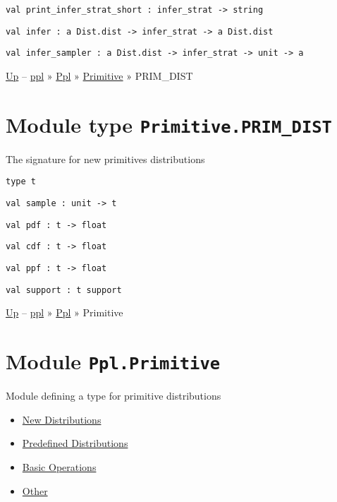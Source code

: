 \protect\hyperlink{val-printux5finferux5fstratux5fshort}{}\texttt{val\ print\_infer\_strat\_short\ :\ infer\_strat\ -\textgreater{}\ string}

\protect\hyperlink{val-infer}{}\texttt{val\ infer\ :\ \textquotesingle{}a\ Dist.dist\ -\textgreater{}\ infer\_strat\ -\textgreater{}\ \textquotesingle{}a\ Dist.dist}

\protect\hyperlink{val-inferux5fsampler}{}\texttt{val\ infer\_sampler\ :\ \textquotesingle{}a\ Dist.dist\ -\textgreater{}\ infer\_strat\ -\textgreater{}\ unit\ -\textgreater{}\ \textquotesingle{}a}

\href{../index.html}{Up} -- \href{../../../index.html}{ppl} »
\href{../../index.html}{Ppl} » \href{../index.html}{Primitive} »
PRIM\_DIST

\section{\texorpdfstring{Module type
\texttt{Primitive.PRIM\_DIST}}{Module type Primitive.PRIM\_DIST}}\label{module-type-primitive.primux5fdist}

The signature for new primitives distributions

\protect\hyperlink{type-t}{}\texttt{type\ t}

\protect\hyperlink{val-sample}{}\texttt{val\ sample\ :\ unit\ -\textgreater{}\ t}

\protect\hyperlink{val-pdf}{}\texttt{val\ pdf\ :\ t\ -\textgreater{}\ float}

\protect\hyperlink{val-cdf}{}\texttt{val\ cdf\ :\ t\ -\textgreater{}\ float}

\protect\hyperlink{val-ppf}{}\texttt{val\ ppf\ :\ t\ -\textgreater{}\ float}

\protect\hyperlink{val-support}{}\texttt{val\ support\ :\ t\ support}

\href{../index.html}{Up} -- \href{../../index.html}{ppl} »
\href{../index.html}{Ppl} » Primitive

\section{\texorpdfstring{Module
\texttt{Ppl.Primitive}}{Module Ppl.Primitive}}\label{module-ppl.primitive}

Module defining a type for primitive distributions

\begin{itemize}
\tightlist
\item
  \protect\hyperlink{newux5fprim}{New Distributions}
\item
  \protect\hyperlink{inbuiltux5fdists}{Predefined Distributions}
\item
  \protect\hyperlink{basicux5fops}{Basic Operations}
\item
  \protect\hyperlink{primux5fother}{Other}
\end{itemize}


